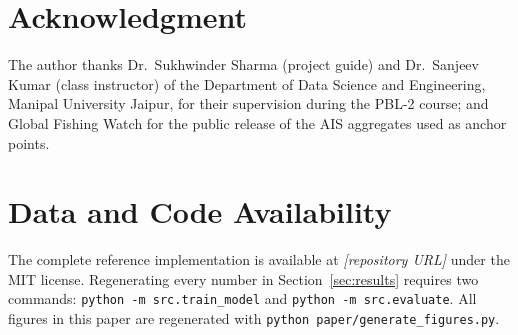 \documentclass[conference]{IEEEtran}
\begin{document}
\section*{Acknowledgment}
The author thanks Dr.~Sukhwinder Sharma (project guide) and Dr.~Sanjeev Kumar (class instructor) of the Department of Data Science and Engineering, Manipal University Jaipur, for their supervision during the PBL-2 course; and Global Fishing Watch for the public release of the AIS aggregates used as anchor points.

\section*{Data and Code Availability}
The complete reference implementation is available at \emph{[repository URL]} under the MIT license. Regenerating every number in Section~\ref{sec:results} requires two commands: \texttt{python -m src.train\_model} and \texttt{python -m src.evaluate}. All figures in this paper are regenerated with \texttt{python paper/generate\_figures.py}.
\end{document}
